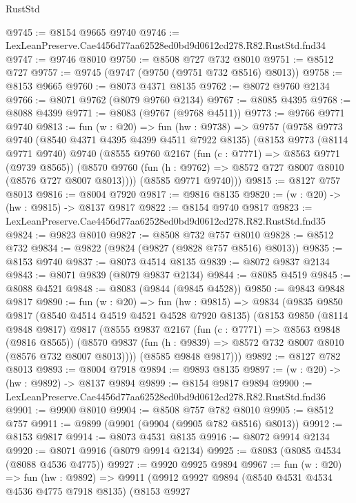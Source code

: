 \begin{lexlean}{RustStd}
\begin{coremodule}
@9745 := @8154 @9665 @9740
@9746 := LexLeanPreserve.Cae4456d77aa62528ed0bd9d0612cd278.R82.RustStd.fnd34
@9747 := @9746 @8010
@9750 := @8508 @727 @732 @8010
@9751 := @8512 @727
@9757 := @9745 (@9747 (@9750 (@9751 @732 @8516) @8013))
@9758 := @8153 @9665
@9760 := @8073 @4371 @8135
@9762 := @8072 @9760 @2134
@9766 := @8071 @9762 (@8079 @9760 @2134)
@9767 := @8085 @4395
@9768 := @8088 @4399
@9771 := @8083 (@9767 (@9768 @4511))
@9773 := @9766 @9771 @9740
@9813 := fun (w : @20) =>
  fun (hw : @9738) =>
  @9757
    (@9758
      @9773
      @9740
      (@8540 @4371 @4395 @4399 @4511 @7922 @8135)
      (@8153
        @9773
        (@8114 @9771 @9740)
        @9740
        (@8555
          @9760
          @2167
          (fun (c : @7771) => @8563 @9771 (@9739 @8565))
          (@8570 @9760 (fun (h : @9762) => @8572 @727 @8007 @8010 (@8576 @727 @8007 @8013))))
        (@8585 @9771 @9740)))
@9815 := @8127 @757 @8013
@9816 := @8004 @7920
@9817 := @9816 @8135
@9820 := (w : @20) -> (hw : @9815) -> @8137 @9817
@9822 := @8154 @9740 @9817
@9823 := LexLeanPreserve.Cae4456d77aa62528ed0bd9d0612cd278.R82.RustStd.fnd35
@9824 := @9823 @8010
@9827 := @8508 @732 @757 @8010
@9828 := @8512 @732
@9834 := @9822 (@9824 (@9827 (@9828 @757 @8516) @8013))
@9835 := @8153 @9740
@9837 := @8073 @4514 @8135
@9839 := @8072 @9837 @2134
@9843 := @8071 @9839 (@8079 @9837 @2134)
@9844 := @8085 @4519
@9845 := @8088 @4521
@9848 := @8083 (@9844 (@9845 @4528))
@9850 := @9843 @9848 @9817
@9890 := fun (w : @20) =>
  fun (hw : @9815) =>
  @9834
    (@9835
      @9850
      @9817
      (@8540 @4514 @4519 @4521 @4528 @7920 @8135)
      (@8153
        @9850
        (@8114 @9848 @9817)
        @9817
        (@8555
          @9837
          @2167
          (fun (c : @7771) => @8563 @9848 (@9816 @8565))
          (@8570 @9837 (fun (h : @9839) => @8572 @732 @8007 @8010 (@8576 @732 @8007 @8013))))
        (@8585 @9848 @9817)))
@9892 := @8127 @782 @8013
@9893 := @8004 @7918
@9894 := @9893 @8135
@9897 := (w : @20) -> (hw : @9892) -> @8137 @9894
@9899 := @8154 @9817 @9894
@9900 := LexLeanPreserve.Cae4456d77aa62528ed0bd9d0612cd278.R82.RustStd.fnd36
@9901 := @9900 @8010
@9904 := @8508 @757 @782 @8010
@9905 := @8512 @757
@9911 := @9899 (@9901 (@9904 (@9905 @782 @8516) @8013))
@9912 := @8153 @9817
@9914 := @8073 @4531 @8135
@9916 := @8072 @9914 @2134
@9920 := @8071 @9916 (@8079 @9914 @2134)
@9925 := @8083 (@8085 @4534 (@8088 @4536 @4775))
@9927 := @9920 @9925 @9894
@9967 := fun (w : @20) =>
  fun (hw : @9892) =>
  @9911
    (@9912
      @9927
      @9894
      (@8540 @4531 @4534 @4536 @4775 @7918 @8135)
      (@8153
        @9927

\end{coremodule}
\end{lexlean}
